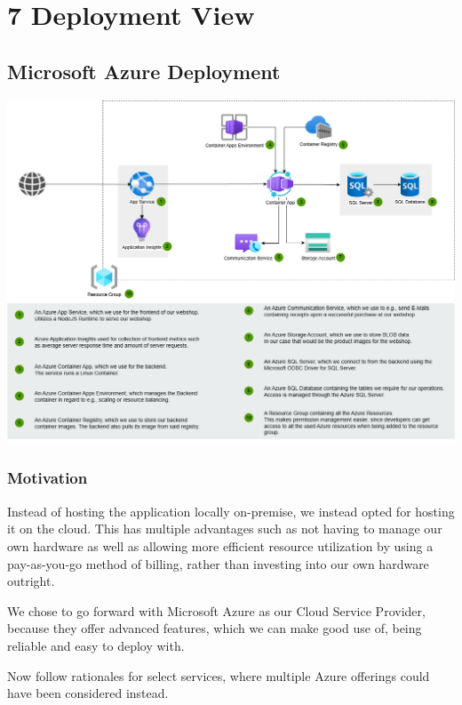 \hypertarget{section-deployment-view}{%
\section{7 Deployment View}\label{section-deployment-view}}

\hypertarget{_infrastructure_level_1}{%
\subsection{Microsoft Azure Deployment}\label{_infrastructure_level_1}}

\includegraphics{images/azure_deployment_view.png}

\subsubsection{Motivation}
Instead of hosting the application locally on-premise, we instead opted for hosting it on the cloud.
This has multiple advantages such as not having to manage our own hardware as well as allowing more efficient resource utilization
by using a pay-as-you-go method of billing, rather than investing into our own hardware outright.

We chose to go forward with Microsoft Azure as our Cloud Service Provider, because they offer advanced features,
which we can make good use of, 
being reliable and easy to deploy with.

Now follow rationales for select services, where multiple Azure offerings could have been considered instead.

